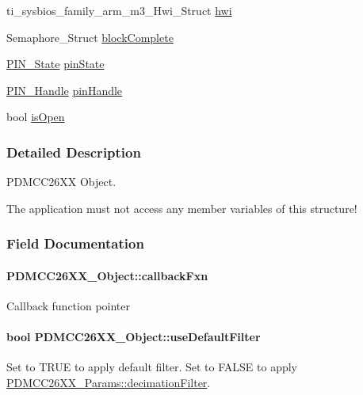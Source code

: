 \begin{DoxyCompactItemize}
\item 
ti\+\_\+sysbios\+\_\+family\+\_\+arm\+\_\+m3\+\_\+\+Hwi\+\_\+\+Struct \hyperlink{struct_p_d_m_c_c26_x_x___object_a91d4e0cdb3f69a1cb92715cccfc9bb03}{hwi}
\item 
Semaphore\+\_\+\+Struct \hyperlink{struct_p_d_m_c_c26_x_x___object_a4a179d0c641910735a3b51fb98170096}{block\+Complete}
\item 
\hyperlink{_p_i_n_8h_a36ef69d50df6baa6973482669c24a522}{P\+I\+N\+\_\+\+State} \hyperlink{struct_p_d_m_c_c26_x_x___object_ad8f04523e0414883b00857c4beac6075}{pin\+State}
\item 
\hyperlink{_p_i_n_8h_afb2de52b054638f63c39df1f30a0d88d}{P\+I\+N\+\_\+\+Handle} \hyperlink{struct_p_d_m_c_c26_x_x___object_a66ad6778e6bfacee79397bf1d44f09fd}{pin\+Handle}
\item 
bool \hyperlink{struct_p_d_m_c_c26_x_x___object_ac89b6cf6088d05b4f52087e67e6bba0e}{is\+Open}
\end{DoxyCompactItemize}


\subsubsection{Detailed Description}
P\+D\+M\+C\+C26\+X\+X Object. 

The application must not access any member variables of this structure! 

\subsubsection{Field Documentation}
\paragraph[{callback\+Fxn}]{ P\+D\+M\+C\+C26\+X\+X\+\_\+\+Object\+::callback\+Fxn}\label{struct_p_d_m_c_c26_x_x___object_a9506c80c0b58cf030d46721d90d96bb7}
Callback function pointer 
\paragraph[{use\+Default\+Filter}]{\setlength{\rightskip}{0pt plus 5cm}bool P\+D\+M\+C\+C26\+X\+X\+\_\+\+Object\+::use\+Default\+Filter}\label{struct_p_d_m_c_c26_x_x___object_aa58da7962e125606a13d81974f6583af}
Set to T\+R\+U\+E to apply default filter. Set to F\+A\+L\+S\+E to apply \hyperlink{struct_p_d_m_c_c26_x_x___params_a5b6560c1288d7f2cf106725784939ec1}{P\+D\+M\+C\+C26\+X\+X\+\_\+\+Params\+::decimation\+Filter}. 
